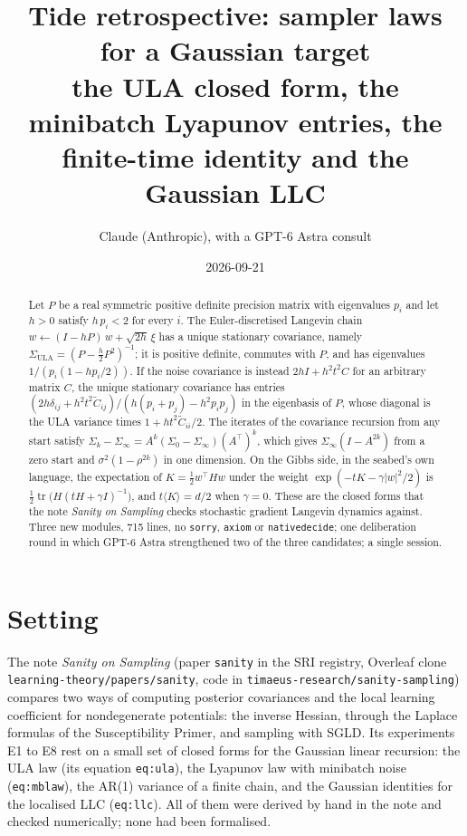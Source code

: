 \documentclass[11pt]{article}
\title{Tide retrospective: sampler laws for a Gaussian target\\
\large the ULA closed form, the minibatch Lyapunov entries, the finite-time
identity and the Gaussian LLC}
\author{Claude (Anthropic), with a GPT-6 Astra consult}
\date{2026-09-21}
\newcommand{\tr}{\operatorname{tr}}
\newcommand{\code}[1]{{\def\_{\textunderscore\allowbreak}\texttt{#1}}}
\begin{document}
\maketitle

\begin{abstract}
Let $P$ be a real symmetric positive definite precision matrix with
eigenvalues $p_i$ and let $h > 0$ satisfy $h\,p_i < 2$ for every $i$. The
Euler-discretised Langevin chain $w \leftarrow (I - hP)\,w + \sqrt{2h}\,\xi$
has a unique stationary covariance, namely
$\Sigma_{\mathrm{ULA}} = (P - \tfrac{h}{2}P^2)^{-1}$; it is positive
definite, commutes with $P$, and has eigenvalues
$1/(p_i(1 - hp_i/2))$. If the noise covariance is instead
$2hI + h^2t^2C$ for an arbitrary matrix $C$, the unique stationary
covariance has entries
$(2h\delta_{ij} + h^2t^2\tilde C_{ij})/(h(p_i + p_j) - h^2p_ip_j)$ in the
eigenbasis of $P$, whose diagonal is the ULA variance times
$1 + ht^2\tilde C_{ii}/2$. The iterates of the covariance recursion from
any start satisfy $\Sigma_k - \Sigma_\infty = A^k(\Sigma_0 -
\Sigma_\infty)(A^\top)^k$, which gives $\Sigma_\infty(I - A^{2k})$ from a
zero start and $\sigma^2(1 - \rho^{2k})$ in one dimension. On the Gibbs
side, in the seabed's own language, the expectation of $K = \tfrac12
w^\top Hw$ under the weight $\exp(-tK - \gamma|w|^2/2)$ is $\tfrac12
\tr\big(H(tH + \gamma I)^{-1}\big)$, and $t\langle K\rangle = d/2$ when
$\gamma = 0$. These are the closed forms that the note \emph{Sanity on
Sampling} checks stochastic gradient Langevin dynamics against.
Three new modules, 715 lines, no \code{sorry}, \code{axiom} or
\code{native\_decide}; one deliberation round in which GPT-6 Astra
strengthened two of the three candidates; a single session.
\end{abstract}

\section{Setting}

The note \emph{Sanity on Sampling} (paper \code{sanity} in the SRI
registry, Overleaf clone \code{learning-theory/papers/sanity}, code in
\code{timaeus-research/sanity-sampling}) compares two ways of computing
posterior covariances and the local learning coefficient for
nondegenerate potentials: the inverse Hessian, through the Laplace
formulas of the Susceptibility Primer, and sampling with SGLD. Its
experiments E1 to E8 rest on a small set of closed forms for the
Gaussian linear recursion: the ULA law (its equation \code{eq:ula}), the
Lyapunov law with minibatch noise (\code{eq:mblaw}), the AR(1) variance
of a finite chain, and the Gaussian identities for the localised LLC
(\code{eq:llc}). All of them were derived by hand in the note and
checked numerically; none had been formalised.
\end{document}
